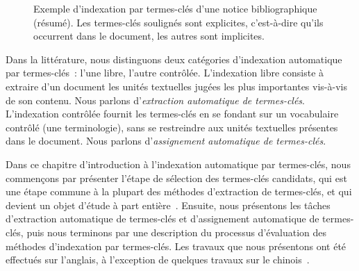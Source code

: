     \begin{figure}
      \caption[
        Exemple d'indexation par termes-clés d'une notice bibliographique
        (résumé)
      ]{
        Exemple d'indexation par termes-clés  d'une notice bibliographique
        (résumé). Les termes-clés soulignés sont explicites, c'est-à-dire
        qu'ils occurrent dans le document, les autres sont implicites.
        \label{fig:main-state_of_the_art-introduction-example_keyphrase_annotation}
      }
    \end{figure}    

    Dans la littérature, nous distinguons deux catégories d'indexation
    automatique par ter\-mes-clés~: l'une libre, l'autre contrôlée. L'indexation
    libre consiste à extraire d'un document les unités textuelles
    jugées les plus importantes vis-à-vis de son contenu. Nous parlons
    d'\emph{extraction automatique de termes-clés}. L'indexation contrôlée fournit les termes-clés en se fondant sur un vocabulaire
    contrôlé (une terminologie), sans se restreindre aux unités textuelles
    présentes dans le document. Nous parlons d'\emph{assignement automatique de
    termes-clés}.

    Dans ce chapitre d'introduction à l'indexation automatique par termes-clés,
    nous commençons par présenter l'étape de sélection des termes-clés
    candidats, qui est une étape commune à la plupart des méthodes d'extraction
    de termes-clés, et qui devient un objet d'étude à part
    entière~\cite{wang2014keyphraseextractionpreprocessing}. Ensuite, nous
    présentons les tâches d'extraction automatique de termes-clés et
    d'assignement automatique de termes-clés, puis nous terminons par une
    description du processus d'évaluation des méthodes d'indexation par
    termes-clés. Les travaux que nous présentons ont été effectués sur
    l'anglais, à l'exception de quelques travaux sur le
    chinois~\cite{ding2011binaryintegerprogramming,zhang2008crfkeywordextraction}.

